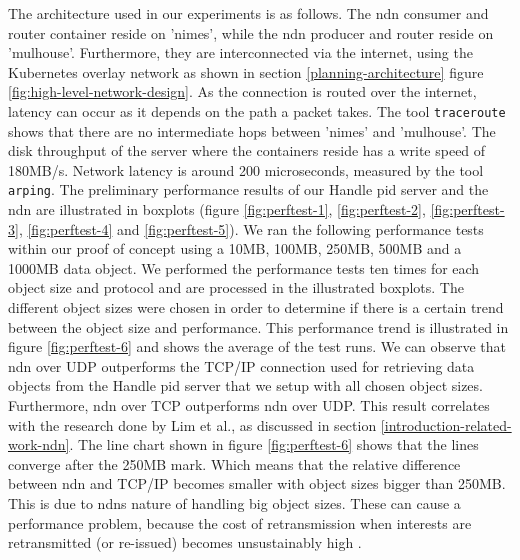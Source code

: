 The architecture used in our experiments is as follows. The \gls{ndn} consumer and router container reside on 'nimes', while the \gls{ndn} producer and router reside on 'mulhouse'. Furthermore, they are interconnected via the internet, using the Kubernetes overlay network as shown in section \ref{planning-architecture} figure \ref{fig:high-level-network-design}. As the connection is routed over the internet, latency can occur as it depends on the path a packet takes. The tool \texttt{traceroute} shows that there are no intermediate hops between 'nimes' and 'mulhouse'. The disk throughput of the server where the containers reside has a write speed of 180MB/s. Network latency is around 200 microseconds, measured by the tool \texttt{arping}.
The preliminary performance results of our Handle \gls{pid} server and the \gls{ndn} are illustrated in boxplots (figure \ref{fig:perftest-1}, \ref{fig:perftest-2}, \ref{fig:perftest-3}, \ref{fig:perftest-4} and \ref{fig:perftest-5}). We ran the following performance tests within our proof of concept using a 10MB, 100MB, 250MB, 500MB and a 1000MB data object. We performed the performance tests ten times for each object size and protocol and are processed in the illustrated boxplots. The different object sizes were chosen in order to determine if there is a certain trend between the object size and performance. This performance trend is illustrated in figure \ref{fig:perftest-6} and shows the average of the test runs. We can observe that \gls{ndn} over UDP outperforms the TCP/IP connection used for retrieving data objects from the Handle \gls{pid} server that we setup with all chosen object sizes. Furthermore, \gls{ndn} over TCP outperforms \gls{ndn} over UDP. This result correlates with the research done by Lim et al., as discussed in section \ref{introduction-related-work-ndn}. The line chart shown in figure \ref{fig:perftest-6} shows that the lines converge after the 250MB mark. Which means that the relative difference between \gls{ndn} and TCP/IP becomes smaller with object sizes bigger than 250MB. This is due to \glspl{ndn} nature of handling big object sizes. These can cause a performance problem, because the cost of retransmission when interests are retransmitted (or re-issued) becomes unsustainably high \cite{ndn-objects}. %

